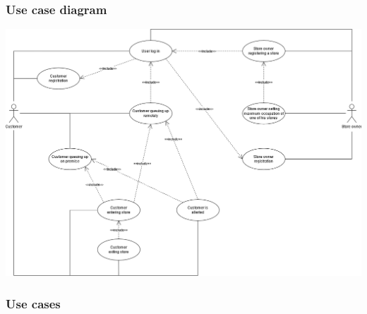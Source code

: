 \subsubsection{Use case diagram}
\includegraphics[scale=0.4]{Images/Use Case Diagram.png}
\newpage
\subsubsection{Use cases}
